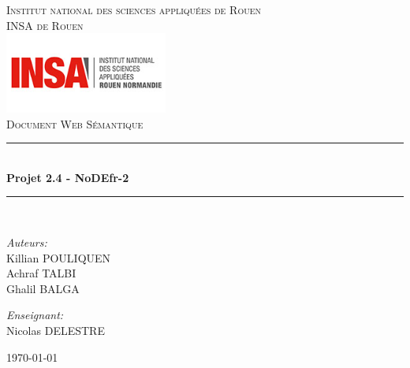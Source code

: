 \documentclass[11pt]{report}
\newcommand{\HRule}{\rule{\linewidth}{0.5mm}}
\begin{document}
\begin{titlepage}

  \begin{center}

    \textsc{{\LARGE Institut national des sciences appliquées de Rouen} \\ \vspace{6
        mm} {\Large INSA de Rouen}} \\
    \vspace{15mm}
    \includegraphics[width=0.4\textwidth]{./INSA.jpg}\\[1.0 cm]

    \textsc{\Large Document Web Sémantique}\\[0.5cm]


    \HRule \\[0.4cm]
           { \huge \bfseries Projet 2.4 - NoDEfr-2}\\[0.4cm]

           \HRule \\[1.5cm]

           \vspace{1.5cm}
           \begin{minipage}{0.4\textwidth}
             \begin{flushleft} \large
               \emph{Auteurs:}\\
               Killian \textsc{POULIQUEN}
               \\
               Achraf \textsc{TALBI}
               \\
               Ghalil \textsc{BALGA}
             \end{flushleft}
           \end{minipage}
           \begin{minipage}{0.4\textwidth}
             \begin{flushright} \large
               \emph{Enseignant:} \\
               Nicolas \textsc{DELESTRE} 
             \end{flushright}
           \end{minipage}

           \vfill
               {\large \today}
  \end{center}
  \tableofcontents
\end{titlepage} 
\end{document}
